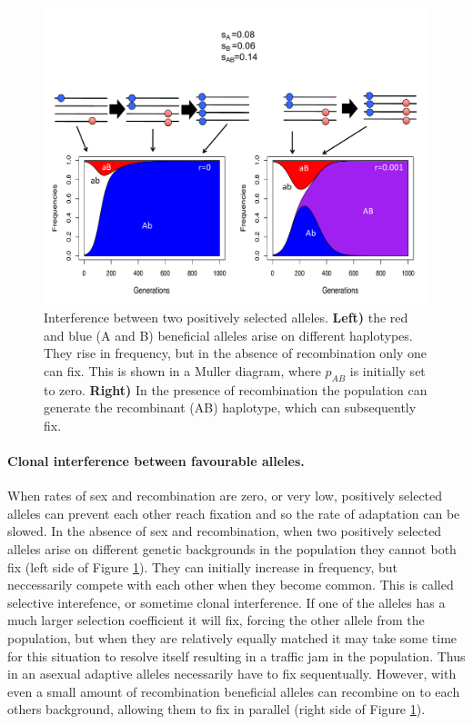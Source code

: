 \begin{figure}
\begin{center}
  \includegraphics[width = 0.8 \textwidth]{figures/selection_recom_interaction/Interference_w_haps.pdf}
\end{center}
\caption{Interference between two positively selected alleles. {\bf Left)} the red and blue (A and B) beneficial alleles arise on different haplotypes. They rise in frequency, but in the absence of recombination only one can fix. This is shown in a Muller diagram, where $p_{AB}$ is initially set to zero. {\bf Right)} In the presence of recombination the population can generate the recombinant (AB) haplotype, which can subsequently fix.} \label{fig:Interference}  %
\end{figure}
\paragraph{Clonal interference between favourable alleles.}
When rates of sex and recombination are zero, or very low, positively selected alleles can prevent each other reach fixation and so the rate of adaptation can be slowed.
In the absence of sex and recombination, when two positively selected alleles arise on different genetic backgrounds in the population they cannot both fix (left side of Figure \ref{fig:Interference}). They can initially increase in frequency, but neccessarily compete with each other when they become common. This is called selective interefence, or sometime clonal interference. If one of the alleles has a much larger selection coefficient it will fix, forcing the other allele from the population, but when they are relatively equally matched it may take some time for this situation to resolve itself resulting in a traffic jam in the population. Thus in an asexual adaptive alleles necessarily have to fix sequentually. However, with even a small amount of recombination beneficial alleles can recombine on to each others background, allowing them to fix in parallel (right side of  Figure \ref{fig:Interference}).   


